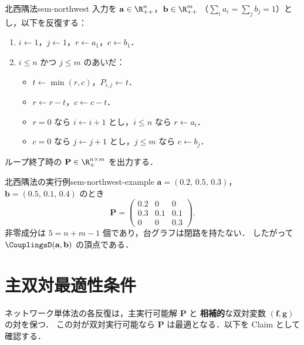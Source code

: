 \begin{definition}{北西隅法}{sem-northwest}
  入力を $\mathbf{a} \in \R_{++}^n$，$\mathbf{b} \in \R_{++}^m$
  （$\sum_i a_i = \sum_j b_j = 1$）とし，以下を反復する：
  \begin{enumerate}
    \item[1.] $i \leftarrow 1$，$j \leftarrow 1$，$r \leftarrow a_1$，$c \leftarrow b_1$．
    \item[2.] $i \leq n$ かつ $j \leq m$ のあいだ：
    \begin{itemize}
      \item $t \leftarrow \min(r, c)$，$P_{i,j} \leftarrow t$．
      \item $r \leftarrow r - t$，$c \leftarrow c - t$．
      \item $r = 0$ なら $i \leftarrow i + 1$ とし，$i \leq n$ なら $r \leftarrow a_i$．
      \item $c = 0$ なら $j \leftarrow j + 1$ とし，$j \leq m$ なら $c \leftarrow b_j$．
    \end{itemize}
  \end{enumerate}
  ループ終了時の $\mathbf{P} \in \R_+^{n \times m}$ を出力する．
\end{definition}

\begin{example}{北西隅法の実行例}{sem-northwest-example}
  $\mathbf{a} = (0.2,\, 0.5,\, 0.3)$，$\mathbf{b} = (0.5,\, 0.1,\, 0.4)$ のとき
  \[
    \mathbf{P} =
    \begin{pmatrix}
      0.2 & 0   & 0   \\
      0.3 & 0.1 & 0.1 \\
      0   & 0   & 0.3
    \end{pmatrix}.
  \]
  非零成分は $5 = n + m - 1$ 個であり，台グラフは閉路を持たない．
  したがって $\CouplingsD(\mathbf{a}, \mathbf{b})$ の頂点である．
\end{example}

\section{主双対最適性条件}
\label{sec:sem-primal-dual}

ネットワーク単体法の各反復は，主実行可能解 $\mathbf{P}$ と
\textbf{相補的}な双対変数 $(\mathbf{f}, \mathbf{g})$ の対を保つ．
この対が双対実行可能なら $\mathbf{P}$ は最適となる．以下を Claim として確認する．

